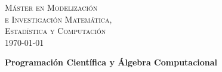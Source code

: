 \documentclass[a4paper,12pt]{article}
\author{Pilar Barbero Iriarte}
\begin{document}
\begin{titlepage}
\begin{center}



\textsc{\LARGE M\'aster en Modelizaci\'on \\e Investigaci\'on Matem\'atica,\\ Estad\'istica y Computaci\'on }\\[1.5cm]
{\large \today}


\vfill

{ \huge \bfseries Programaci\'on Cient\'ifica y \'Algebra Computacional \\[0.4cm] }

\vfill




\end{center}
\end{titlepage}
\end{document}

